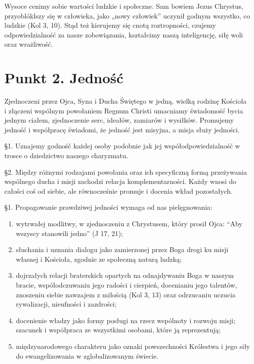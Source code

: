  Wysoce cenimy sobie wartości ludzkie i społeczne. Sam bowiem Jezus Chrystus, przyoblókłszy się w człowieka, jako „nowy człowiek” uczynił godnym wszystko, co ludzkie (Kol 3, 10). Stąd też kierujemy się cnotą roztropności, czujemy odpowiedzialność za nasze zobowiązania, kształcimy naszą inteligencję, siłę woli oraz wrażliwość.


\section{Punkt 2. Jedność}


 
 Zjednoczeni przez Ojca, Syna i Ducha Świętego w jedną, wielką rodzinę Kościoła i złączeni wspólnym powołaniem Regnum Christi umacniamy świadomość bycia jednym ciałem, zjednoczenie serc, ideałów, zamiarów i wysiłków. Promujemy jedność i współpracę świadomi, że jedność jest misyjna, a misja służy jedności.
 
 
 \S{}1. Uznajemy godność każdej osoby podobnie jak jej współodpowiedzialność w trosce o dziedzictwo naszego charyzmatu.


\S{}2. Między różnymi rodzajami powołania oraz ich specyficzną formą przeżywania wspólnego ducha i misji zachodzi relacja komplementarności. Każdy wnosi do całości coś od siebie, ale równocześnie promuje i  docenia wkład pozostałych.
 
 
 \S{}1. Propagowanie prawdziwej jedności wymaga od nas pielęgnowania:


\begin{enumerate}


\item wytrwałej modlitwy, w zjednoczeniu z Chrystusem, który prosił Ojca: “Aby wszyscy stanowili jedno” (J 17, 21);


\item słuchania i uznania dialogu jako zamierzonej przez Boga drogi ku misji własnej i Kościoła, zgodnie ze społeczną naturą ludzką;


\item dojrzałych relacji braterskich opartych na odnajdywaniu Boga w naszym bracie, współodczuwaniu jego radości i cierpień, docenianiu jego talentów, znoszeniu siebie nawzajem z miłością (Kol 3, 13) oraz odrzucaniu uczucia rywalizacji, nieufności i zazdrości;


\item docenienie władzy jako formy posługi na rzecz wspólnoty i rozwoju misji; szacunek i współpraca ze wszystkimi osobami, które ją reprezentują;


\item międzynarodowego charakteru jako oznaki powszechności Królestwa i jego siły do ewangelizowania w zglobalizowanym świecie.


\end{enumerate}



